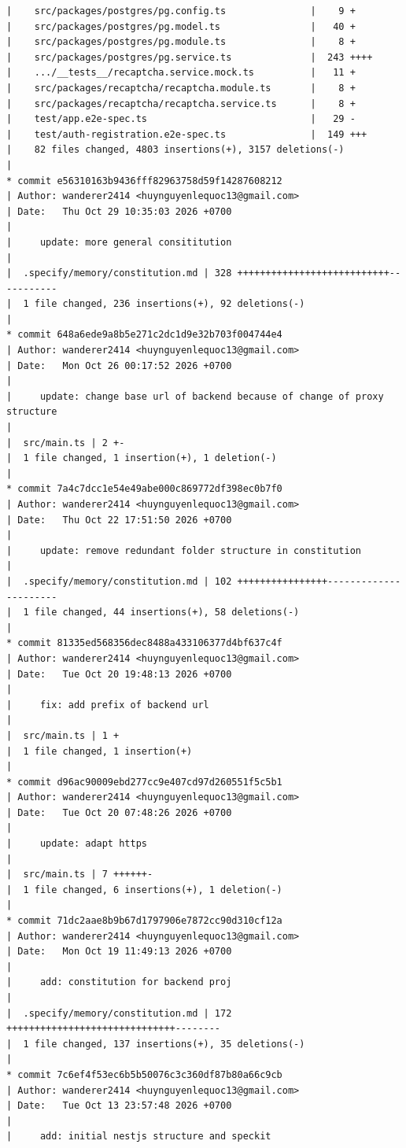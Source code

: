 \documentclass[12pt]{article}
\begin{document}
\begin{lstlisting}[numbers=none,breaklines=true]
|    src/packages/postgres/pg.config.ts               |    9 +
|    src/packages/postgres/pg.model.ts                |   40 +
|    src/packages/postgres/pg.module.ts               |    8 +
|    src/packages/postgres/pg.service.ts              |  243 ++++
|    .../__tests__/recaptcha.service.mock.ts          |   11 +
|    src/packages/recaptcha/recaptcha.module.ts       |    8 +
|    src/packages/recaptcha/recaptcha.service.ts      |    8 +
|    test/app.e2e-spec.ts                             |   29 -
|    test/auth-registration.e2e-spec.ts               |  149 +++
|    82 files changed, 4803 insertions(+), 3157 deletions(-)
|
* commit e56310163b9436fff82963758d59f14287608212
| Author: wanderer2414 <huynguyenlequoc13@gmail.com>
| Date:   Thu Oct 29 10:35:03 2026 +0700
|
|     update: more general consititution
|
|  .specify/memory/constitution.md | 328 +++++++++++++++++++++++++++-----------
|  1 file changed, 236 insertions(+), 92 deletions(-)
|
* commit 648a6ede9a8b5e271c2dc1d9e32b703f004744e4
| Author: wanderer2414 <huynguyenlequoc13@gmail.com>
| Date:   Mon Oct 26 00:17:52 2026 +0700
|
|     update: change base url of backend because of change of proxy structure
|
|  src/main.ts | 2 +-
|  1 file changed, 1 insertion(+), 1 deletion(-)
|
* commit 7a4c7dcc1e54e49abe000c869772df398ec0b7f0
| Author: wanderer2414 <huynguyenlequoc13@gmail.com>
| Date:   Thu Oct 22 17:51:50 2026 +0700
|
|     update: remove redundant folder structure in constitution
|
|  .specify/memory/constitution.md | 102 ++++++++++++++++----------------------
|  1 file changed, 44 insertions(+), 58 deletions(-)
|
* commit 81335ed568356dec8488a433106377d4bf637c4f
| Author: wanderer2414 <huynguyenlequoc13@gmail.com>
| Date:   Tue Oct 20 19:48:13 2026 +0700
|
|     fix: add prefix of backend url
|
|  src/main.ts | 1 +
|  1 file changed, 1 insertion(+)
|
* commit d96ac90009ebd277cc9e407cd97d260551f5c5b1
| Author: wanderer2414 <huynguyenlequoc13@gmail.com>
| Date:   Tue Oct 20 07:48:26 2026 +0700
|
|     update: adapt https
|
|  src/main.ts | 7 ++++++-
|  1 file changed, 6 insertions(+), 1 deletion(-)
|
* commit 71dc2aae8b9b67d1797906e7872cc90d310cf12a
| Author: wanderer2414 <huynguyenlequoc13@gmail.com>
| Date:   Mon Oct 19 11:49:13 2026 +0700
|
|     add: constitution for backend proj
|
|  .specify/memory/constitution.md | 172 ++++++++++++++++++++++++++++++--------
|  1 file changed, 137 insertions(+), 35 deletions(-)
|
* commit 7c6ef4f53ec6b5b50076c3c360df87b80a66c9cb
| Author: wanderer2414 <huynguyenlequoc13@gmail.com>
| Date:   Tue Oct 13 23:57:48 2026 +0700
|
|     add: initial nestjs structure and speckit

\end{lstlisting}
\end{document}

